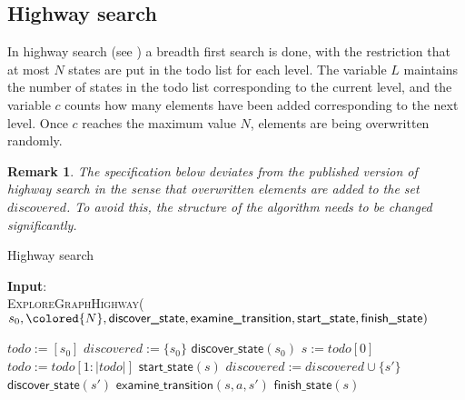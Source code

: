 \documentclass{article}
\newtheorem{remark}[theorem]{Remark}
\newcommand{\concat}{\ensuremath{+\!\!+\:}}
\begin{document}
\newpage
\subsection{Highway search}

In highway search (see \cite{DBLP:journals/jlp/EngelsGWW09}) a breadth first search is done, with the restriction that at most $N$ states are put in the todo list for each level. The variable $L$ maintains the number of states in the todo list corresponding to the current level, and the variable $c$ counts how many elements have been added corresponding to the next level. Once $c$ reaches the maximum value $N$,  elements are being overwritten randomly.

\begin{remark}
The specification below deviates from the published version of highway search in the
sense that overwritten elements are added to the set $discovered$. To avoid this,
the structure of the algorithm needs to be changed significantly.
\end{remark}

\begin{algorithm}
\small
\caption{Highway search}
\vspace*{1ex}
{\textbf{Input}:} \\
\textsc{ExploreGraphHighway}($s_0, \colored{N}, \textsf{discover\_state}, \textsf{examine\_transition}, \textsf{start\_state}, \textsf{finish\_state})$
\begin{algorithmic}[1]
\State $todo := [s_0]$
\State $discovered := \{ s_0 \}$
\State $\textsf{discover\_state}(s_0)$
\State {}
\State {}
  \State $s := todo[0]$
  \State $todo := todo[1:|todo|]$
  \State $\textsf{start\_state}(s)$
      \State $discovered := discovered \cup \{s' \}$
      \State $\textsf{discover\_state}(s')$
      \State {}
        \State \colored{$todo := todo \concat [s']$}
      \Else
        \State {}
          \State {}
        \EndIf  
      \EndIf
    \EndIf
    \State $\textsf{examine\_transition}(s, a, s')$
  \EndFor
  \State $\textsf{finish\_state}(s)$
  \State {}
    \State {}
    \State {}
  \EndIf
\EndWhile
\end{algorithmic}
\end{algorithm}
\end{document}
